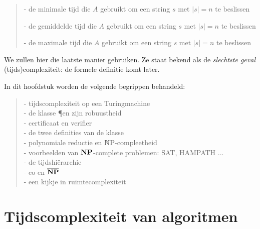 \begin{verse}
- de minimale tijd die $A$ gebruikt om een string $s$ met $|s| = n$ te beslissen

- de gemiddelde tijd die $A$ gebruikt om een string $s$ met $|s| = n$ te beslissen

- de maximale tijd die $A$ gebruikt om een string $s$ met $|s| = n$ te beslissen
\end{verse}

\begin{sloppypar}
We zullen hier die laatste manier gebruiken. Ze staat bekend als de
{\em slechtste geval} {\mbox (tijds)complexiteit}: de formele
definitie komt later.
\end{sloppypar}

In dit hoofdstuk worden de volgende begrippen behandeld: 
\begin{verse}
- tijdscomplexiteit op een Turingmachine
\\
- de klasse \P en zijn robuustheid
\\
- certificaat en verifier
\\
- de twee definities van de klasse \NP
\\
- polynomiale reductie en $\mathbb{N}$P-compleetheid
\\
- voorbeelden van ${\bf NP}$-complete problemen: SAT, HAMPATH ...
\\
- de tijdshi\"erarchie
\\
- co-\NP en $\overline{{\bf NP}}$
\\
- een kijkje in ruimtecomplexiteit
\end{verse}




\section{Tijdscomplexiteit van algoritmen}
 



